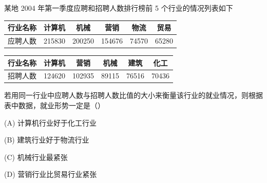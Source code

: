 \begin{question}
某地 2004 年第一季度应聘和招聘人数排行榜前 5 个行业的情况列表如下

\begin{center}
\begin{tabular}{lccccc}
\toprule
行业名称 & 计算机 & 机械 & 营销 & 物流 & 贸易 \\
\midrule
应聘人数 & 215830 & 200250 & 154676 & 74570 & 65280 \\
\bottomrule
\end{tabular}
\end{center}

\begin{center}
\begin{tabular}{lccccc}
\toprule
行业名称 & 计算机 & 营销 & 机械 & 建筑 & 化工 \\
\midrule
招聘人数 & 124620 & 102935 & 89115 & 76516 & 70436 \\
\bottomrule
\end{tabular}
\end{center}

若用同一行业中应聘人数与招聘人数比值的大小来衡量该行业的就业情况，则根据表中数据，就业形势一定是（\qquad）

(A) 计算机行业好于化工行业

(B) 建筑行业好于物流行业

(C) 机械行业最紧张

(D) 营销行业比贸易行业紧张

\end{question}

